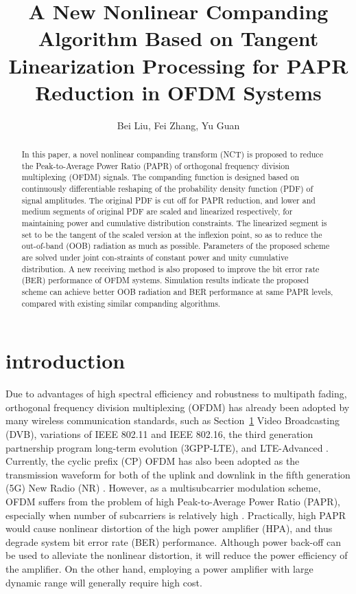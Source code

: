 \documentclass{ccjnl}
\title{A New Nonlinear Companding Algorithm Based on Tangent Linearization Processing for PAPR Reduction in OFDM Systems}
\author{Bei Liu\inst{1,2,*}, Fei Zhang\inst{1}, Yu Guan\inst{1,2}\corinfo{http://www.cic-chinacommunications.cn}}
\begin{document}
\maketitle

\begin{abstract}
In this paper, a novel nonlinear companding transform (NCT) is proposed to reduce the Peak-to-Average Power Ratio (PAPR) of orthogonal frequency division multiplexing (OFDM) signals. The companding function is designed based on continuously differentiable reshaping of the probability density function (PDF) of signal amplitudes. The original PDF is cut off for PAPR reduction, and lower and medium segments of original PDF are scaled and linearized respectively, for maintaining power and cumulative distribution constraints. The linearized segment is set to be the tangent of the scaled version at the inflexion point, so as to reduce the out-of-band (OOB) radiation as much as possible. Parameters of the proposed scheme are solved under joint con-straints of constant power and unity cumulative distribution. A new receiving method is also proposed to improve the bit error rate (BER) performance of OFDM systems. Simulation results indicate the proposed scheme can achieve better OOB radiation and BER performance at same PAPR levels, compared with existing similar companding algorithms.
\end{abstract}

\section{introduction}
\label{s1}

Due to advantages of high spectral efficiency and robustness to multipath fading, orthogonal frequency division multiplexing (OFDM) has already been adopted by many wireless communication standards, such as Section~\ref{s1} Video Broadcasting (DVB), variations of IEEE 802.11 and IEEE 802.16, the third generation partnership program long-term evolution (3GPP-LTE), and LTE-Advanced \cite{1,2}. Currently, the cyclic prefix (CP) OFDM has also been adopted as the transmission waveform for both of the uplink and downlink in the fifth generation (5G) New Radio (NR) \cite{3}. However, as a multisubcarrier modulation scheme, OFDM suffers from the problem of high Peak-to-Average Power Ratio (PAPR), especially when number of subcarriers is relatively high \cite{4}. Practically, high PAPR would cause nonlinear distortion of the high power amplifier (HPA), and thus degrade system bit error rate (BER) performance. Although power back-off can be used to alleviate the nonlinear distortion, it will reduce the power efficiency of the amplifier. On the other hand, employing a power amplifier with large dynamic range will generally require high cost.
\end{document}
